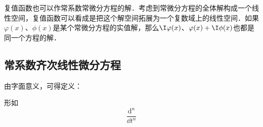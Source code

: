 复值函数也可以作常系数常微分方程的解．考虑到常微分方程的全体解构成一个线性空间，复值函数可以看成是把这个解空间拓展为一个复数域上的线性空间．如果$\varphi(x)$、$\phi(x)$是某个常微分方程的实值解，那么$\I\varphi(x)$、$\varphi(x)+\I \phi(x)$也都是同一个方程的解．


\subsection{常系数齐次线性微分方程}

由字面意义，可得定义：
\begin{definition}{}
形如
\begin{equation}
\frac{\mathrm{d}^n}{\dd t^n}
\end{equation}
\end{definition}































